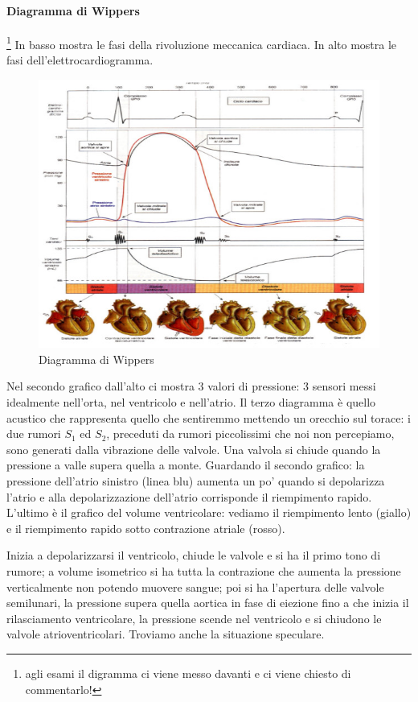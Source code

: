 \documentclass[a4paper,12pt]{article}
\begin{document}
\paragraph{Diagramma di Wippers}\footnote{agli esami il digramma ci viene messo davanti e ci viene chiesto di commentarlo!}
In basso mostra le fasi della rivoluzione meccanica cardiaca. In alto mostra le fasi dell'elettrocardiogramma.
\begin{figure}[H]
\centering
\includegraphics[scale=0.4]{immagine/wippers.jpg}
\caption{Diagramma di Wippers}
\end{figure}

Nel secondo grafico dall'alto ci mostra 3 valori di pressione: 3 sensori messi idealmente nell'orta, nel ventricolo e nell'atrio. Il terzo diagramma è quello acustico che rappresenta quello che sentiremmo mettendo un orecchio sul torace: i due rumori $S_{1}$ ed $S_{2}$, preceduti da rumori piccolissimi che noi non percepiamo, sono generati dalla vibrazione delle valvole. Una valvola si chiude quando la pressione a valle supera quella a monte. Guardando il secondo grafico: la pressione dell'atrio sinistro (linea blu) aumenta un po' quando si depolarizza l'atrio e alla depolarizzazione dell'atrio corrisponde il riempimento rapido.  L'ultimo è il grafico del volume ventricolare: vediamo il riempimento lento (giallo) e il riempimento rapido sotto contrazione atriale (rosso).

Inizia a depolarizzarsi il ventricolo, chiude le valvole e si ha il primo tono di rumore; a volume isometrico si ha tutta la contrazione che aumenta la pressione verticalmente non potendo muovere sangue; poi si ha l'apertura delle valvole semilunari, la pressione supera quella aortica in fase di eiezione fino a che inizia il rilasciamento ventricolare, la pressione scende nel ventricolo e si chiudono le valvole atrioventricolari. Troviamo anche la situazione speculare. 
\end{document}
